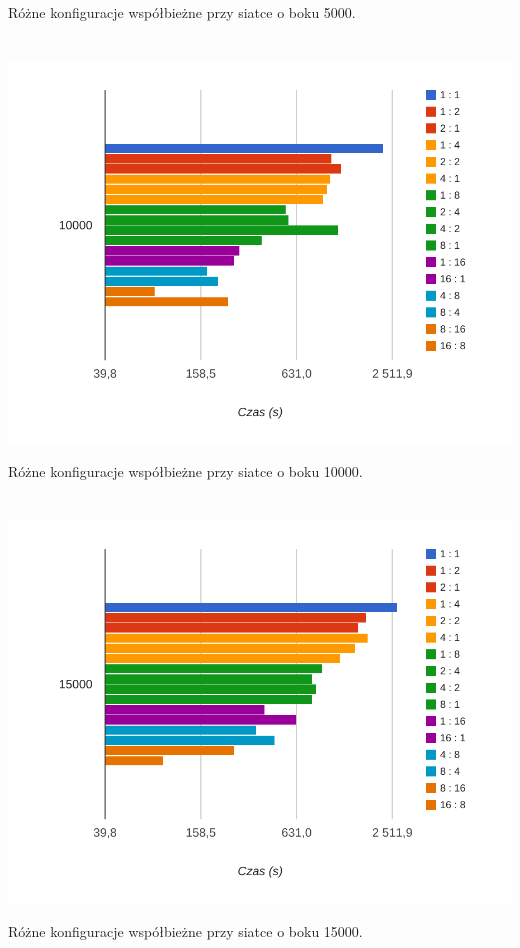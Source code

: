 \documentclass[paper=a4, fontsize=11pt]{scrartcl}	%
\numberwithin{equation}{section}		%
\numberwithin{figure}{section}			%
\numberwithin{table}{section}				%
\begin{document}
\begin{center}
Różne konfiguracje współbieżne przy siatce o boku 5000.
\\ \ \\ \ \\


\includegraphics[width=135mm]{report/time-10000.pdf}

Różne konfiguracje współbieżne przy siatce o boku 10000.
\\ \ \\ \ \\


\includegraphics[width=135mm]{report/time-15000.pdf}

Różne konfiguracje współbieżne przy siatce o boku 15000.
\\ \ \\ \ \\



\end{center}
\end{document}
